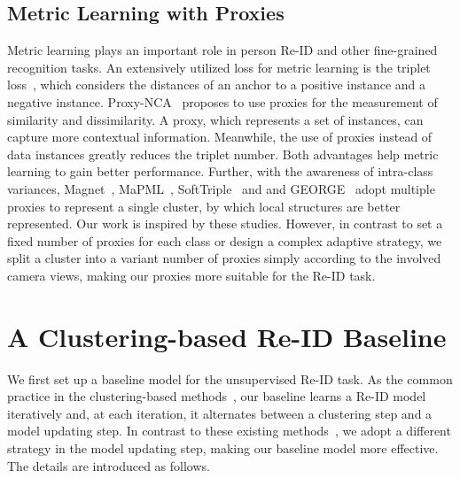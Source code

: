 \documentclass[letterpaper]{article} %
\begin{document}
\subsection{Metric Learning with Proxies}
Metric learning plays an important role in person Re-ID and other fine-grained recognition tasks. An extensively utilized loss for metric learning is the triplet loss~\cite{hermans2017defense}, which considers the distances of an anchor to a positive instance and a negative instance. %
Proxy-NCA~\cite{Attias2017proxy} proposes to use proxies for the measurement of similarity and dissimilarity. A proxy, which represents a set of instances, can capture more contextual information. Meanwhile, the use of proxies instead of data instances greatly reduces the triplet number. Both advantages help metric learning to gain better performance. Further, with the awareness of intra-class variances, Magnet~\cite{Rippel2016multi-center}, MaPML~\cite{Qian2018proxy}, SoftTriple~\cite{qian2019softtriple} and and GEORGE~\cite{sohoni2020no} adopt multiple proxies to represent a single cluster, by which local structures are better represented. %
Our work is inspired by these studies. However, in contrast to set a fixed number of proxies for each class or design a complex adaptive strategy, we split a cluster into a variant number of proxies simply according to the involved camera views, making our proxies more suitable for the Re-ID task.  




\section{A Clustering-based Re-ID Baseline}%
\label{sec:baseline}
We first set up a baseline model for the unsupervised Re-ID task. As the common practice in the clustering-based methods~\cite{unsup_clustering,lin2019aBottom,zeng2020hierarchical}, our baseline learns a Re-ID model iteratively and, at each iteration, it alternates between a clustering step and a model updating step. In contrast to these existing methods~\cite{unsup_clustering,lin2019aBottom,zeng2020hierarchical}, we adopt a different strategy in the model updating step, making our baseline model more effective. The details are introduced as follows. 
\end{document}
